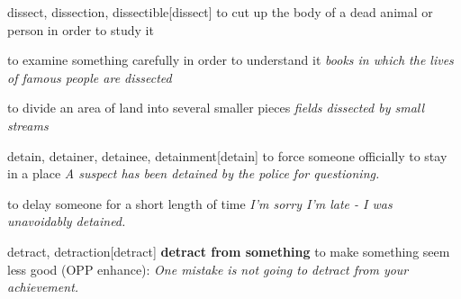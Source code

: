 \begin{word}{dissect, dissection, dissectible}[dissect]
    to cut up the body of a dead animal or person in order to study it

    to examine something carefully in order to understand it
    \textit{books in which the lives of famous people are dissected}

    to divide an area of land into several smaller pieces
    \textit{fields dissected by small streams}
\end{word}

\begin{word}{detain, detainer, detainee, detainment}[detain]
    to force someone officially to stay in a place
    \textit{A suspect has been detained by the police for questioning.}

    to delay someone for a short length of time
\textit{I'm sorry I'm late - I was unavoidably detained.}
\end{word}

\begin{word}{detract, detraction}[detract]
    \textbf{detract from something}
    to make something seem less good (OPP  enhance):
    \textit{One mistake is not going to detract from your achievement.}
\end{word}